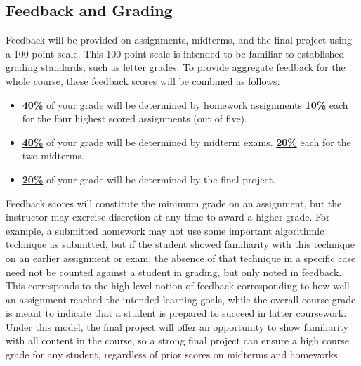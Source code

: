 \documentclass[11pt]{article}
\begin{document}
\subsection*{Feedback and Grading}
Feedback will be provided on assignments, midterms, and the final project using a 100 point scale.
This 100 point scale is intended to be familiar to established grading standards, such as letter grades. To provide aggregate feedback for the whole course, these feedback scores will be combined as follows:
\begin{itemize}
	\item \underline{\textbf{40\%}} of your grade will be determined by homework assignments
	\subitem \underline{\textbf{10\%}} each for the four highest scored assignments (out of five).
	\item \underline{\textbf{40\%}} of your grade will be determined by midterm exams.
	\subitem \underline{\textbf{20\%}} each for the two midterms.
	\item \underline{\textbf{20\%}} of your grade will be determined by the final project.
\end{itemize}

\noindent Feedback scores will constitute the minimum grade on an assignment, but the instructor
may exercise discretion at any time to award a higher grade. For example, a submitted homework
may not use some important algorithmic technique as submitted, but if the student showed familiarity
with this technique on an earlier assignment or exam, the absence of that technique in a specific
case need not be counted against a student in grading, but only noted in feedback. This corresponds to the high level notion of feedback corresponding to how well an assignment reached the intended learning goals, while the overall course grade is meant to indicate that a student is prepared to succeed in latter coursework. Under this model, the final project will offer an opportunity to show familiarity with all content in the course, so a strong final project can ensure a high course grade
for any student, regardless of prior scores on midterms and homeworks.


\end{document}
